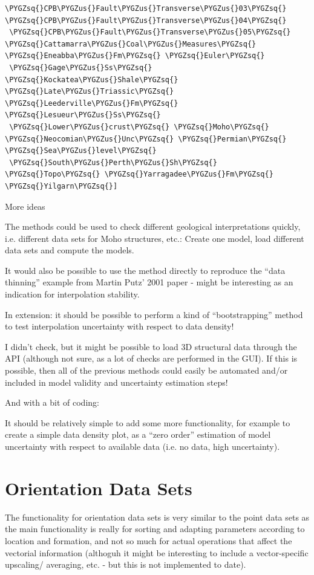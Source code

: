 \documentclass[letterpaper,10pt,english]{sphinxmanual}
\def\PYGZus{\char`\_}
\def\PYGZsq{\char`\'}
\begin{document}
\begin{Verbatim}[commandchars=\\\{\}]
 \PYGZsq{}CPB\PYGZus{}Fault\PYGZus{}Transverse\PYGZus{}03\PYGZsq{} \PYGZsq{}CPB\PYGZus{}Fault\PYGZus{}Transverse\PYGZus{}04\PYGZsq{}
 \PYGZsq{}CPB\PYGZus{}Fault\PYGZus{}Transverse\PYGZus{}05\PYGZsq{} \PYGZsq{}Cattamarra\PYGZus{}Coal\PYGZus{}Measures\PYGZsq{} \PYGZsq{}Eneabba\PYGZus{}Fm\PYGZsq{} \PYGZsq{}Euler\PYGZsq{}
 \PYGZsq{}Gage\PYGZus{}Ss\PYGZsq{} \PYGZsq{}Kockatea\PYGZus{}Shale\PYGZsq{} \PYGZsq{}Late\PYGZus{}Triassic\PYGZsq{} \PYGZsq{}Leederville\PYGZus{}Fm\PYGZsq{} \PYGZsq{}Lesueur\PYGZus{}Ss\PYGZsq{}
 \PYGZsq{}Lower\PYGZus{}crust\PYGZsq{} \PYGZsq{}Moho\PYGZsq{} \PYGZsq{}Neocomian\PYGZus{}Unc\PYGZsq{} \PYGZsq{}Permian\PYGZsq{} \PYGZsq{}Sea\PYGZus{}level\PYGZsq{}
 \PYGZsq{}South\PYGZus{}Perth\PYGZus{}Sh\PYGZsq{} \PYGZsq{}Topo\PYGZsq{} \PYGZsq{}Yarragadee\PYGZus{}Fm\PYGZsq{} \PYGZsq{}Yilgarn\PYGZsq{}]
\end{Verbatim}

More ideas

The methods could be used to check different geological interpretations
quickly, i.e. different data sets for Moho structures, etc.: Create one
model, load different data sets and compute the models.

It would also be possible to use the method directly to reproduce the
``data thinning'' example from Martin Putz' 2001 paper - might be
interesting as an indication for interpolation stability.

In extension: it should be possible to perform a kind of ``bootstrapping''
method to test interpolation uncertainty with respect to data density!

I didn't check, but it might be possible to load 3D structural data
through the API (although not sure, as a lot of checks are performed in
the GUI). If this is possible, then all of the previous methods could
easily be automated and/or included in model validity and uncertainty
estimation steps!

And with a bit of coding:

It should be relatively simple to add some more functionality, for
example to create a simple data density plot, as a ``zero order''
estimation of model uncertainty with respect to available data (i.e. no
data, high uncertainty).


\chapter{Orientation Data Sets}
\label{3D-Structural-Data:orientation-data-sets}
The functionality for orientation data sets is very similar to the point
data sets as the main functionality is really for sorting and adapting
parameters according to location and formation, and not so much for
actual operations that affect the vectorial information (althoguh it
might be interesting to include a vector-specific upscaling/ averaging,
etc. - but this is not implemented to date).
\end{document}
